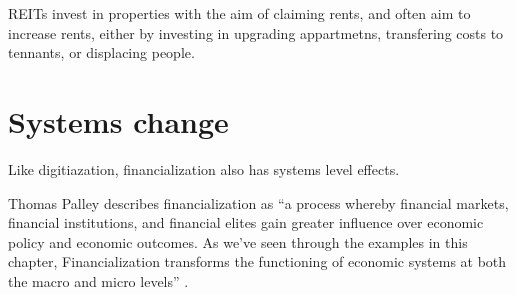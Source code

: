 REITs invest in properties with the aim of claiming rents, and often aim to increase rents, either by investing in upgrading appartmetns, transfering costs to tennants, or displacing people. %

\section{Systems change}



Like digitiazation, financialization also has systems level effects. 

Thomas Palley describes financialization as ``a process whereby financial markets, financial institutions, and financial elites gain greater influence over economic policy and economic outcomes. As we've seen through the examples in this chapter, Financialization transforms the functioning of economic systems at both the macro and micro levels'' \cite{palleyFinancializationWhatIt2007}. 

